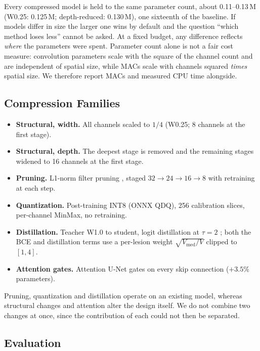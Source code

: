 \documentclass[conference]{IEEEtran}
\begin{document}
Every compressed model is held to the same parameter count, about
0.11--0.13\,M (W0.25: 0.125\,M; depth-reduced: 0.130\,M), one sixteenth
of the baseline. If models differ in size the
larger one wins by default and the question ``which method loses less''
cannot be asked. At a fixed budget, any difference reflects \emph{where}
the parameters were spent. Parameter count alone is not a fair cost
measure: convolution parameters scale with the square of the channel
count and are independent of spatial size, while MACs scale with channels
squared \emph{times} spatial size. We therefore report MACs and measured
CPU time alongside.

\subsection{Compression Families}

\begin{itemize}
  \item \textbf{Structural, width.} All channels scaled to $1/4$ (W0.25;
        8 channels at the first stage).
  \item \textbf{Structural, depth.} The deepest stage is removed and the
        remaining stages widened to 16 channels at the first stage.
  \item \textbf{Pruning.} L1-norm filter pruning \cite{li2017pruning},
        staged $32\!\to\!24\!\to\!16\!\to\!8$ with retraining at each step.
  \item \textbf{Quantization.} Post-training INT8 (ONNX QDQ), 256
        calibration slices, per-channel MinMax, no retraining.
  \item \textbf{Distillation.} Teacher W1.0 to student, logit
        distillation at $\tau=2$ \cite{hinton2015distilling}; both the BCE
        and distillation terms use a per-lesion weight
        $\sqrt{V_{\mathrm{med}}/V}$ clipped to $[1,4]$.
  \item \textbf{Attention gates.} Attention U-Net gates
        \cite{oktay2018attention} on every skip connection
        ($+3.5\%$ parameters).
\end{itemize}

Pruning, quantization and distillation operate on an existing model,
whereas structural changes and attention alter the design itself. We do
not combine two changes at once, since the contribution of each could not
then be separated.

\subsection{Evaluation}
\end{document}
